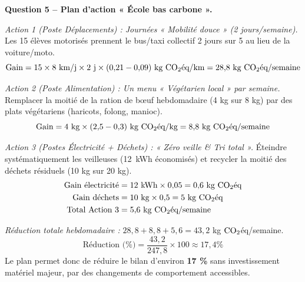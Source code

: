 \documentclass[11pt]{article}
\begin{document}
\begin{exoresolu}
\textbf{Question 5 -- Plan d'action « École bas carbone ».}

\emph{Action 1 (Poste Déplacements) : Journées « Mobilité douce » (2 jours/semaine).} Les 15 élèves motorisés prennent le bus/taxi collectif 2 jours sur 5 au lieu de la voiture/moto.
\[ \text{Gain} = 15 \times 8 \text{ km/j} \times 2 \text{ j} \times (0{,}21 - 0{,}09) \text{ kg $\ce{CO2}$éq/km} = 28{,}8 \text{ kg $\ce{CO2}$éq/semaine} \]

\emph{Action 2 (Poste Alimentation) : Un menu « Végétarien local » par semaine.} Remplacer la moitié de la ration de bœuf hebdomadaire (4 kg sur 8 kg) par des plats végétariens (haricots, folong, manioc).
\[ \text{Gain} = 4 \text{ kg} \times (2{,}5 - 0{,}3) \text{ kg $\ce{CO2}$éq/kg} = 8{,}8 \text{ kg $\ce{CO2}$éq/semaine} \]

\emph{Action 3 (Postes Électricité + Déchets) : « Zéro veille \& Tri total ».} Éteindre systématiquement les veilleuses (\SI{12}{kWh} économisés) et recycler la moitié des déchets résiduels (10 kg sur 20 kg).
\begin{align*}
\text{Gain électricité} &= 12 \text{ kWh} \times 0{,}05 = 0{,}6 \text{ kg $\ce{CO2}$éq} \\
\text{Gain déchets} &= 10 \text{ kg} \times 0{,}5 = 5 \text{ kg $\ce{CO2}$éq} \\
\text{Total Action 3} &= 5{,}6 \text{ kg $\ce{CO2}$éq/semaine}
\end{align*}

\emph{Réduction totale hebdomadaire :} $28{,}8 + 8{,}8 + 5{,}6 = 43{,}2$ kg $\ce{CO2}$éq/semaine.
\[ \text{Réduction (\%)} = \frac{43{,}2}{247{,}8} \times 100 \approx 17{,}4 \% \]
Le plan permet donc de réduire le bilan d'environ \textbf{17 \%} sans investissement matériel majeur, par des changements de comportement accessibles.


\end{exoresolu}
\end{document}
